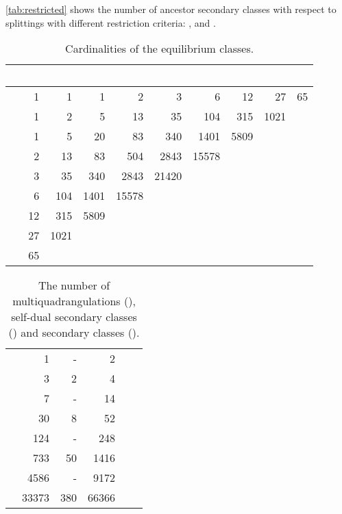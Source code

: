 \documentclass[]{article}
\newcommand{\nfour}{}
\newcommand{\neight}{}
\newcommand{\ntwelve}{}
\newcommand{\nsteen}{}
\begin{document}
\autoref{tab:restricted} shows the number of ancestor secondary classes with respect to splittings with different restriction criteria: ,  and .

\begin{table}[p]\centering
  \begin{tabular}{rrrrrrrrrr}
    \hline
    {\ }  & 
    &  &  &  &  &  &  &  &  \\
    \hline
    & {1} & \nfour 1   & 1    & \neight 2    & 3   & \ntwelve 6    & 12  & \nsteen 27 & 65\\
    &\nfour 1  & 2   & \neight 5    & 13   & \ntwelve 35  & 104  & \nsteen 315 &1021\\
    & 1  & \neight 5   & 20 & \ntwelve 83  & 340 & \nsteen 1401 &5809\\
    &\neight 2  & 13  & \ntwelve 83   & 504 & \nsteen 2843 &15578\\
    & 3  & \ntwelve 35  & 340  & \nsteen 2843 &21420\\
    &\ntwelve 6  & 104 & \nsteen 1401 &15578\\
    & 12 & \nsteen 315 &5809\\
    &\nsteen 27 &1021\\
     &65\\
    \hline
  \end{tabular}
\caption{Cardinalities  of the equilibrium classes.}
  \label{tab:cardinalities}
\end{table}

\begin{table}\centering
  \begin{tabular}{lrrrrr}
    \hline
    &  &  & \\
    \hline
  &     1 &     - &     2\\
      &     3 &     2 &     4\\
      &     7 &     - &    14\\
      &    30 &     8 &    52\\
      &   124 &     - &   248\\
      &   733 &    50 &  1416\\
      &  4586 &     - &  9172\\
     & 33373 &   380 & 66366\\
    \hline
  \end{tabular}
  \caption{The number of multiquadrangulations (), self-dual secondary classes () and secondary classes ().}
  \label{tab:q}
\end{table}
\end{document}
